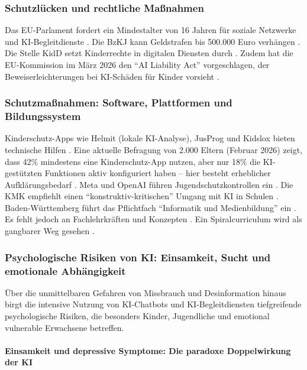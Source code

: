 \documentclass[12pt,a4paper]{article}
\begin{document}
	\subsubsection{Schutzlücken und rechtliche Maßnahmen}
	
	Das EU-Parlament fordert ein Mindestalter von 16 Jahren für soziale Netzwerke und KI-Begleitdienste \cite{EUParliament2025}. Die BzKJ kann Geldstrafen bis 500.000 Euro verhängen \cite{BzKJ2025a}. Die Stelle KidD setzt Kinderrechte in digitalen Diensten durch \cite{KidD2025}. Zudem hat die EU-Kommission im März 2026 den \enquote{AI Liability Act} vorgeschlagen, der Beweiserleichterungen bei KI-Schäden für Kinder vorsieht \cite{EUAILiability2026}.
	
	\subsubsection{Schutzmaßnahmen: Software, Plattformen und Bildungssystem}
	
	Kinderschutz-Apps wie Helmit (lokale KI-Analyse), JusProg und Kidslox bieten technische Hilfen \cite{Helmit2025, JusProg2025, Kidslox2025}. Eine aktuelle Befragung von 2.000 Eltern (Februar 2026) zeigt, dass 42\% mindestens eine Kinderschutz-App nutzen, aber nur 18\% die KI-gestützten Funktionen aktiv konfiguriert haben – hier besteht erheblicher Aufklärungsbedarf \cite{Elternstudie2026}. Meta und OpenAI führen Jugendschutzkontrollen ein \cite{Meta2025, OpenAI2025}. Die KMK empfiehlt einen \enquote{konstruktiv-kritischen} Umgang mit KI in Schulen \cite{KMK2025}. Baden-Württemberg führt das Pflichtfach \enquote{Informatik und Medienbildung} ein \cite{BW2025}. Es fehlt jedoch an Fachlehrkräften und Konzepten \cite{DLV2025}. Ein Spiralcurriculum wird als gangbarer Weg gesehen \cite{Spiralcurriculum2025}.
	
	\subsubsection{Psychologische Risiken von KI: Einsamkeit, Sucht und emotionale Abhängigkeit}
	
	Über die unmittelbaren Gefahren von Missbrauch und Desinformation hinaus birgt die intensive Nutzung von KI-Chatbots und KI-Begleitdiensten tiefgreifende psychologische Risiken, die besonders Kinder, Jugendliche und emotional vulnerable Erwachsene betreffen.
	
	\paragraph{Einsamkeit und depressive Symptome: Die paradoxe Doppelwirkung der KI}
	
\end{document}
